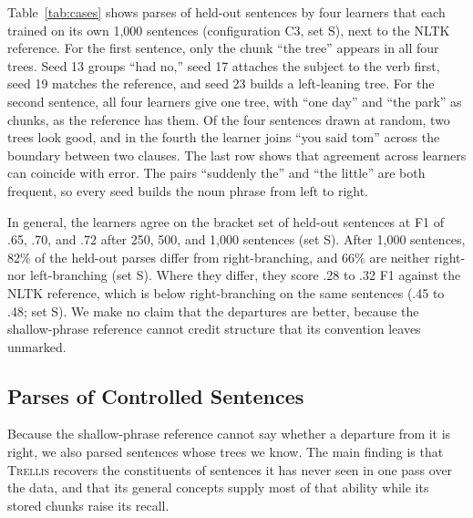 \documentclass[11pt,letterpaper]{article}
\newcommand{\trellis}{\textsc{Trellis}}
\begin{document}
Table~\ref{tab:cases} shows parses of held-out sentences by four learners that each trained on its own 1,000 sentences (configuration C3, set S), next to the NLTK reference.
For the first sentence, only the chunk ``the tree'' appears in all four trees. Seed 13 groups ``had no,'' seed 17 attaches the subject to the verb first, seed 19 matches the reference, and seed 23 builds a left-leaning tree.
For the second sentence, all four learners give one tree, with ``one day'' and ``the park'' as chunks, as the reference has them.
Of the four sentences drawn at random, two trees look good, and in the fourth the learner joins ``you said tom'' across the boundary between two clauses.
The last row shows that agreement across learners can coincide with error. The pairs ``suddenly the'' and ``the little'' are both frequent, so every seed builds the noun phrase from left to right.

In general, the learners agree on the bracket set of held-out sentences at F1 of .65, .70, and .72 after 250, 500, and 1,000 sentences (set S).
After 1,000 sentences, 82\% of the held-out parses differ from right-branching, and 66\% are neither right- nor left-branching (set S).
Where they differ, they score .28 to .32 F1 against the NLTK reference, which is below right-branching on the same sentences (.45 to .48; set S).
We make no claim that the departures are better, because the shallow-phrase reference cannot credit structure that its convention leaves unmarked.

\subsection{Parses of Controlled Sentences}
\label{sec:controlled-parse}

Because the shallow-phrase reference cannot say whether a departure from it is right, we also parsed sentences whose trees we know. The main finding is that \trellis{} recovers the constituents of sentences it has never seen in one pass over the data, and that its general concepts supply most of that ability while its stored chunks raise its recall.
\end{document}
